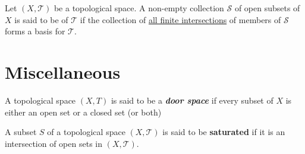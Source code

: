 \documentclass[10pt,a4paper]{report}
\newcommand{\TT}{\mathcal{T}}
\newcommand{\SB}{\mathcal{S}}
\begin{document}
\begin{definition}[Subbasis] Let $(X, \TT)$ be a topological space.  A non-empty collection $\SB$ of open subsets of $X$ is said to be  of $\TT$ if the collection of \underline{all finite intersections} of members of $\SB$ forms a basis for $\TT$.
\end{definition}

\section{Miscellaneous}

\begin{definition} A topological space $(X,T)$ is said to be a \textbf{\textit{door space}} if every subset of $X$ is either an open set or a closed set (or both)
\end{definition}

\begin{definition}A subset $S$ of a topological space $(X,\TT)$ is said to be \textbf{saturated} if it is an intersection of open sets in $(X, \TT)$.
\end{definition}
\end{document}

